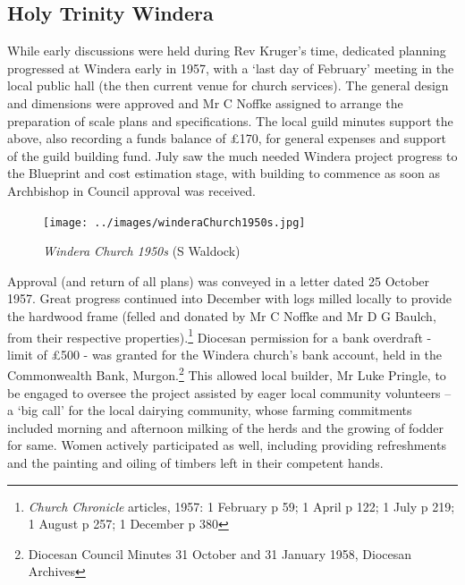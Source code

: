 \subsection{Holy Trinity Windera}



While early discussions were held during Rev Kruger's time, dedicated planning progressed at Windera early in 1957, with a `last day of February' meeting in the local public hall (the then current venue for church services). The general design and dimensions were approved and Mr C Noffke assigned to arrange the preparation of scale plans and specifications. The local guild minutes support the above, also recording a funds balance of \pounds170, for general expenses and support of the guild building fund. July saw the much needed Windera project progress to the Blueprint and cost estimation stage, with building to commence as soon as Archbishop in Council approval was received.









\begin{figure}[!htb]
\begin{center}
\texttt{[image: ../images/winderaChurch1950s.jpg]}
\caption{{\itshape Windera Church 1950s} {\scriptsize(S Waldock)}}
\end{center}
\end{figure}




Approval (and return of all plans) was conveyed in a letter dated 25 October 1957. Great progress continued into December with logs milled locally to provide the hardwood frame (felled and donated by Mr C Noffke and Mr D G Baulch, from their respective properties).\footnote{\emph{Church Chronicle} articles, 1957: 1 February p 59; 1 April p 122; 1 July p 219; 1 August p 257; 1 December p 380} Diocesan permission for a bank overdraft - limit of \pounds500 - was granted for the Windera church's bank account, held in the Commonwealth Bank, Murgon.\footnote{Diocesan Council Minutes 31 October and 31 January 1958, Diocesan Archives} This allowed local builder, Mr Luke Pringle, to be engaged to oversee the project assisted by eager local community volunteers -- a `big call' for the local dairying community, whose farming commitments included morning and afternoon milking of the herds and the growing of fodder for same. Women actively participated as well, including providing refreshments and the painting and oiling of timbers left in their competent hands.


